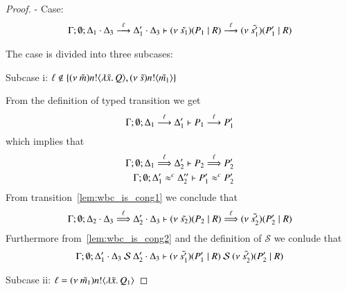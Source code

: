\begin{proof}

	\noi - Case: 
	\[
		\Gamma; \emptyset; \Delta_1 \cdot \Delta_3 \stackrel{\ell}{\longrightarrow} \Delta_1' \cdot \Delta_3 \vdash (\nu\ \tilde{s_1})(P_1 \;|\; R) \stackrel{\ell}{\longrightarrow} (\nu\ \tilde{s_1'})(P_1' \;|\; R)
	\]

	\noi The case is divided into three subcases:

	\noi Subcase i: $\ell \notin \{(\nu\ \tilde{m}) n ! \langle \lambda \tilde{x}.\,Q \rangle, (\nu\ \tilde{s}) n ! \langle \tilde{m_1} \rangle\}$

	\noi From the definition of typed transition we get
	\[
		\Gamma; \emptyset; \Delta_1 \stackrel{\ell}{\longrightarrow} \Delta_1' \vdash P_1 \stackrel{\ell}{\longrightarrow} P_1'
	\]
	\noi which implies that
%
	\begin{eqnarray}
		\Gamma; \emptyset; \Delta_1 \stackrel{\ell}{\Longrightarrow} \Delta_2' \vdash P_2 \stackrel{\ell}{\Longrightarrow} P_2' \label{lem:wbc_is_cong1}\\
		\Gamma; \emptyset; \Delta_1' \approx^{c} \Delta_2'' \vdash P_1' \approx^{c} P_2' \label{lem:wbc_is_cong2}
	\end{eqnarray}
%
	\noi From transition~\ref{lem:wbc_is_cong1} we conclude that 
	\[
		\Gamma;\emptyset; \Delta_2 \cdot \Delta_3 \stackrel{\ell}{\Longrightarrow} \Delta_2' \cdot \Delta_3 \vdash (\nu\ \tilde{s_2})(P_2 \;|\; R) \stackrel{\ell}{\Longrightarrow} (\nu\ \tilde{s_2'})(P_2' \;|\; R)
	\]
%
	\noi Furthermore from~\ref{lem:wbc_is_cong2} and the definition of $\mathcal{S}$ we conlude that
	\[
		\Gamma; \emptyset; \Delta_1' \cat \Delta_3\ \mathcal{S}\ \Delta_2' \cat \Delta_3 \proves \newsp{\tilde{s_1'}}{P_1' \Par R}\ \mathcal{S}\ \newsp{\tilde{s_2'}}{P_2' \Par R}
	\]

	\noi Subcase ii: $\ell = (\nu\ \tilde{m_1}) n ! \langle \lambda \tilde{x}.\,Q_1 \rangle$


\end{proof}
